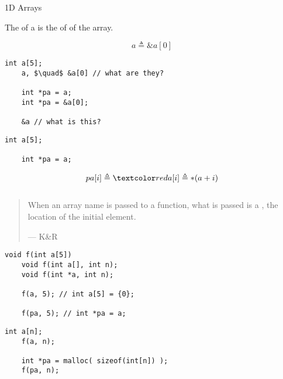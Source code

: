 \begin{frame}{}
  \centerline{\LARGE 1D Arrays}
\end{frame}

\begin{frame}[fragile]{}
  \begin{definition}
    The  of a  is the  of  of the array.

    \[
      a \triangleq \&a[0]
    \]
  \end{definition}

  \vspace{0.40cm}
  \pause
  \centerline{}

  \vspace{0.40cm}
  \begin{lstlisting}[style = Cstyle]
    int a[5];
    a, $\quad$ &a[0] // what are they?
    
    int *pa = a; 
    int *pa = &a[0];

    &a // what is this?
  \end{lstlisting}
\end{frame}

\begin{frame}[fragile]{}
  \begin{lstlisting}[style = Cstyle]
    int a[5];

    int *pa = a;
  \end{lstlisting}

  \begin{definition}
    \[
      pa[i] \triangleq \red{a[i]} \triangleq \ast (a + i)
    \]
  \end{definition}

  \begin{lstlisting}[style = Cstyle]
  \end{lstlisting}
\end{frame}

\begin{frame}[fragile]{}
  \begin{quote}
    When an array name is passed to a function,
    what is passed is a , the location of the initial element.

    \hfill --- K\&R
  \end{quote}

  \begin{lstlisting}[style = Cstyle]
    void f(int a[5])
    void f(int a[], int n);
    void f(int *a, int n);

    f(a, 5); // int a[5] = {0};

    f(pa, 5); // int *pa = a;
  \end{lstlisting}

  \begin{lstlisting}[style = Cstyle]
    int a[n];
    f(a, n);

    int *pa = malloc( sizeof(int[n]) ); 
    f(pa, n);
  \end{lstlisting}
\end{frame}
